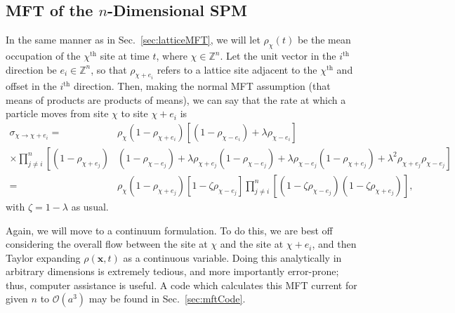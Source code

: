 \subsection{MFT of the $n$-Dimensional SPM} \label{sec:nDMftDeriv}
In the same manner as in Sec.~\ref{sec:latticeMFT}, we will let $\rho_\chi (t)$ be the mean occupation of the $\chi^\mathrm{th}$ site
at time $t$, where $\chi \in \mathbb{Z}^n$. Let the unit vector in the $i^\mathrm{th}$
direction be $e_i \in \mathbb{Z}^n$, so that $\rho_{\chi+e_i}$ refers to a lattice site adjacent to the $\chi^\mathrm{th}$ and offset in the $i^\mathrm{th}$ direction. Then,
making the normal MFT assumption (that means of products are products of means),
we can say that the rate at which a particle moves from site $\chi$ to site $\chi+e_i$ is
\begin{equation}
\begin{aligned}
 \sigma_{\chi \rightarrow \chi + e_i} =& \rho_\chi (1 - \rho_{\chi+e_i}) \left[ \left( 1- \rho_{\chi-e_i} \right) + \lambda \rho_{\chi-e_i} \right] \\
 \times \prod_{j \ne i}^n \left[  (1-\rho_{\chi+e_j})\right.&\left.(1-\rho_{\chi-e_j}) + \lambda\rho_{\chi+e_j}(1-\rho_{\chi-e_j}) + \lambda \rho_{\chi-e_j}(1-\rho_{\chi+e_j}) + \lambda^2 \rho_{\chi+e_j}\rho_{\chi-e_j} \right] \\
   =& \rho_\chi \left( 1 -  \rho_{\chi+e_j} \right) \left[ 1 - \zeta \rho_{\chi-e_j} \right] \prod_{j \ne i}^n 
   \left[ (1-\zeta\rho_{\chi- e_j})(1-\zeta \rho_{\chi+e_j}) \right],
\end{aligned}
\end{equation}
with $\zeta = 1 - \lambda$ as usual.

Again, we will move to a continuum formulation. To do this, we are best off considering the overall flow
between the site at $\chi$ and the site at $\chi+e_i$, and then Taylor expanding $\rho(\mathbf{x}, t)$ as a continuous
variable. Doing this analytically in arbitrary dimensions is extremely tedious, and more importantly error-prone; thus, computer assistance is useful. A code which calculates this MFT current for given $n$
to $\mathcal{O}(a^3)$ may be found in Sec.~\ref{sec:mftCode}.


